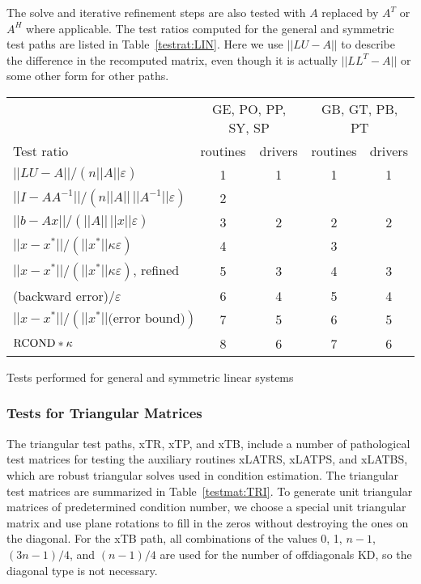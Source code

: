 The solve and iterative refinement steps are also tested with
$A$ replaced by $A^T$ or $A^H$ where applicable.  The test ratios
computed for the general and symmetric test paths
are listed in Table~\ref{testrat:LIN}.  Here we use $|| LU - A ||$
to describe the difference in the recomputed matrix, even though
it is actually $|| L L^T - A ||$ or some other form for other paths.

\TS
\begin{tabular}{|l||c|c|c|c|} \hline
           & \multicolumn{2}{c|}{GE, PO, PP, SY, SP}
           & \multicolumn{2}{|c|}{GB, GT, PB, PT} \\ \cline{2-5}
Test ratio & routines & drivers & routines & drivers \\ \hline
$ || LU - A || / ( n || A || \varepsilon ) $ & 1 & 1 & 1 & 1 \\
$ || I - A A^{-1} || / ( n || A || \, || A^{-1} || \varepsilon )$
   & 2 &   &    &   \\
$ || b - A x || / ( || A || \, || x || \varepsilon) $ & 3 & 2 & 2 & 2 \\
$ || x - x^* || / ( || x^* || \kappa \varepsilon ) $  & 4 &   & 3 &   \\
$ || x - x^* || / ( || x^* || \kappa \varepsilon )$, refined & 5 & 3 & 4 & 3 \\
(backward error)$ / \varepsilon $ & 6 & 4 & 5 & 4 \\
$ || x - x^* || / ( || x^* || \mbox{(error bound)} ) $ & 7 & 5 & 6 & 5 \\
$ {\rm RCOND} * \kappa $ & 8 & 6 & 7 & 6 \\ \hline
\end{tabular}
\caption{Tests performed for general and symmetric linear systems}
\label{testrat:LIN}
\TE

\subsubsection{Tests for Triangular Matrices}
\dent
The triangular test paths, xTR, xTP, and xTB, include a number of
pathological test matrices for testing the auxiliary routines xLATRS,
xLATPS, and xLATBS, which are robust triangular solves used in
condition estimation.  The triangular test matrices are summarized
in Table~\ref{testmat:TRI}.
To generate unit triangular matrices of predetermined condition number,
we choose a special unit triangular matrix and use plane
rotations to fill in the zeros without destroying the ones on the
diagonal.
For the xTB path, all combinations of the values 0, 1, $n-1$,
$(3n-1)/4$, and $(n-1)/4$ are used for the number of offdiagonals
$\mbox{KD}$, so the diagonal type is not necessary.

